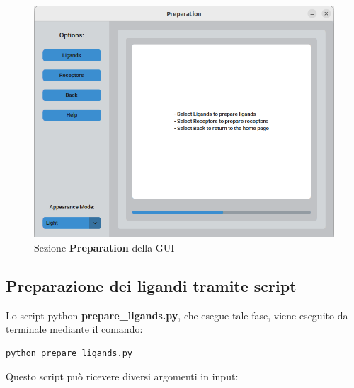 \begin{figure}[H]
    \centering
    \includegraphics[scale=0.6]{immagini/preparation.png}
    \caption{Sezione \textbf{Preparation} della GUI}
    \label{fig:preparation}
\end{figure}

\subsection{Preparazione dei ligandi tramite script} \label{Preparazione dei ligandi script}
Lo script python \textbf{prepare\_ligands.py}, che esegue tale fase, viene eseguito da terminale mediante il comando:

\begin{lstlisting}[language=Bash, label=lst:code3, caption={Comando per scaricare la repository}]
python prepare_ligands.py
\end{lstlisting}

Questo script può ricevere diversi argomenti in input:

